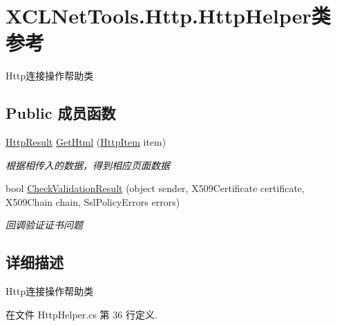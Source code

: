 \hypertarget{class_x_c_l_net_tools_1_1_http_1_1_http_helper}{\section{X\-C\-L\-Net\-Tools.\-Http.\-Http\-Helper类 参考}
\label{class_x_c_l_net_tools_1_1_http_1_1_http_helper}
}


Http连接操作帮助类  


\subsection*{Public 成员函数}
\begin{DoxyCompactItemize}
\item 
\hyperlink{class_x_c_l_net_tools_1_1_http_1_1_http_result}{Http\-Result} \hyperlink{class_x_c_l_net_tools_1_1_http_1_1_http_helper_a1115d0f405e29654961ad3bcd5272bdf}{Get\-Html} (\hyperlink{class_x_c_l_net_tools_1_1_http_1_1_http_item}{Http\-Item} item)
\begin{DoxyCompactList}\small\item\em 根据相传入的数据，得到相应页面数据 \end{DoxyCompactList}\item 
bool \hyperlink{class_x_c_l_net_tools_1_1_http_1_1_http_helper_aed104c08e4f4e44e2f3b7529e85c2848}{Check\-Validation\-Result} (object sender, X509\-Certificate certificate, X509\-Chain chain, Ssl\-Policy\-Errors errors)
\begin{DoxyCompactList}\small\item\em 回调验证证书问题 \end{DoxyCompactList}\end{DoxyCompactItemize}


\subsection{详细描述}
Http连接操作帮助类 



在文件 Http\-Helper.\-cs 第 36 行定义.



